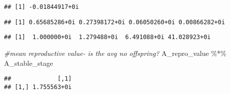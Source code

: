 \documentclass[
]{article}
\newenvironment{Shaded}{\begin{snugshade}}{\end{snugshade}}
\newcommand{\CommentTok}[1]{\textcolor[rgb]{0.56,0.35,0.01}{\textit{#1}}}
\newcommand{\DecValTok}[1]{\textcolor[rgb]{0.00,0.00,0.81}{#1}}
\newcommand{\FunctionTok}[1]{\textcolor[rgb]{0.00,0.00,0.00}{#1}}
\newcommand{\NormalTok}[1]{#1}
\newcommand{\OtherTok}[1]{\textcolor[rgb]{0.56,0.35,0.01}{#1}}
\newcommand{\SpecialCharTok}[1]{\textcolor[rgb]{0.00,0.00,0.00}{#1}}
\begin{document}
\begin{verbatim}
## [1] -0.01844917+0i
\end{verbatim}

\begin{Shaded}
\end{Shaded}

\begin{verbatim}
## [1] 0.65685286+0i 0.27398172+0i 0.06050260+0i 0.00866282+0i
\end{verbatim}

\begin{Shaded}
\end{Shaded}

\begin{verbatim}
## [1]  1.000000+0i  1.279488+0i  6.491088+0i 41.028923+0i
\end{verbatim}

\begin{Shaded}
\begin{Highlighting}[]
\CommentTok{\#mean reproductive value{-} is the avg no offspring?}
\NormalTok{A\_repro\_value }\SpecialCharTok{\%*\%}\NormalTok{ A\_stable\_stage}
\end{Highlighting}
\end{Shaded}

\begin{verbatim}
##             [,1]
## [1,] 1.755563+0i
\end{verbatim}
\end{document}
